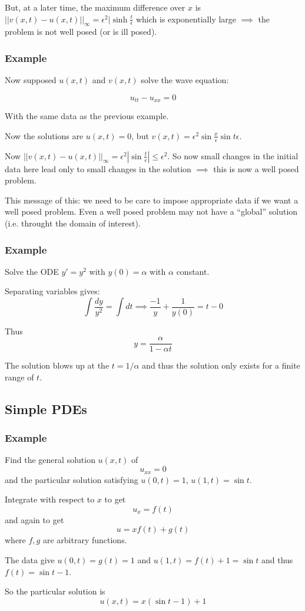 But, at a later time, the maximum difference over $x$ is $|| v(x, t) - u(x, t) ||_{\infty} = \epsilon^2 | \sinh \frac{t}{\epsilon}$ which is exponentially large $\implies$ the problem is not well posed (or is ill posed).

\subsubsection*{Example}

Now supposed $u(x, t)$ and $v(x,t)$ solve the wave equation:

$$u_{tt} - u_{xx} = 0$$

With the same data as the previous example.

\vspace{\baselineskip}

Now the solutions are $u(x, t) = 0$, but $v(x, t) = \epsilon^2 \sin \frac{x}{\epsilon} \sin {t}{\epsilon}$.

Now $|| v(x, t) - u(x, t) ||_{\infty} = \epsilon^2 | \sin \frac{t}{\epsilon} | \leq \epsilon^2$. So now small changes in the initial data here lead only to small changes in the solution $\implies$ this is now a well posed problem.

This message of this: we need to be care to impose appropriate data if we want a well posed problem. Even a well posed problem may not have a ``global'' solution (i.e. throught the domain of interest).

\subsubsection*{Example}

Solve the ODE $y' = y^2$ with $y(0) = \alpha$ with $\alpha$ constant.

Separating variables gives: $$\int \frac{dy}{y^2} = \int dt \implies \frac{-1}{y} + \frac{1}{y(0)} = t - 0$$

Thus $$y = \frac{\alpha}{1 - \alpha t}$$

The solution blows up at the $ t = 1/\alpha$ and thus the solution only exists for a finite range of $t$.

\subsection{Simple PDEs}

\subsubsection*{Example}

Find the general solution $u(x, t)$ of $$u_{xx} = 0$$ and the particular solution satisfying $u(0, t) = 1$, $u(1, t) = \sin t$.

Integrate with respect to $x$ to get $$u_x = f(t)$$ and again to get $$u = x f(t) + g(t)$$ where $f, g$ are arbitrary functions.

The data give $u(0, t) = g(t) = 1$ and $u(1, t) = f(t) + 1 = \sin t$ and thus $f(t) = \sin t - 1$.

So the particular solution is $$u(x,t) = x (\sin t - 1) + 1$$